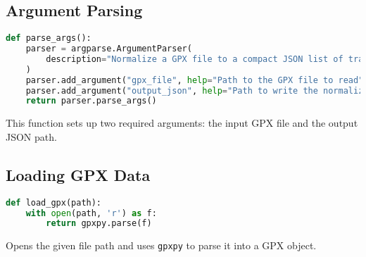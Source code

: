\documentclass{article}
\begin{document}
\subsection{Argument Parsing}
\begin{lstlisting}[language=Python]
def parse_args():
    parser = argparse.ArgumentParser(
        description="Normalize a GPX file to a compact JSON list of track-point objects"
    )
    parser.add_argument("gpx_file", help="Path to the GPX file to read")
    parser.add_argument("output_json", help="Path to write the normalized JSON output")
    return parser.parse_args()
\end{lstlisting}
This function sets up two required arguments: the input GPX file and the output JSON path.

\subsection{Loading GPX Data}
\begin{lstlisting}[language=Python]
def load_gpx(path):
    with open(path, 'r') as f:
        return gpxpy.parse(f)
\end{lstlisting}
Opens the given file path and uses \texttt{gpxpy} to parse it into a GPX object.
\end{document}
